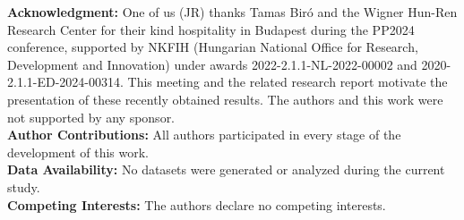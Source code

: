 \documentclass[epjST]{svjour}
\begin{document}
\noindent\textbf{Acknowledgment:} 
One of us (JR) thanks Tamas Bir\'o and the Wigner Hun-Ren Research Center for their kind hospitality in Budapest during the PP2024 conference, supported by NKFIH (Hungarian National Office for Research, Development and Innovation) under awards 2022-2.1.1-NL-2022-00002 and 2020-2.1.1-ED-2024-00314. This meeting and the related research report motivate the presentation of these recently obtained results. The authors and this work were not supported by any sponsor.\\
\textbf{Author Contributions:} All authors participated in every stage of the development of this work.\\
\textbf{Data Availability:} No datasets were generated or analyzed during the current study.\\
\textbf{Competing Interests:} The authors declare no competing interests.



\end{document}

